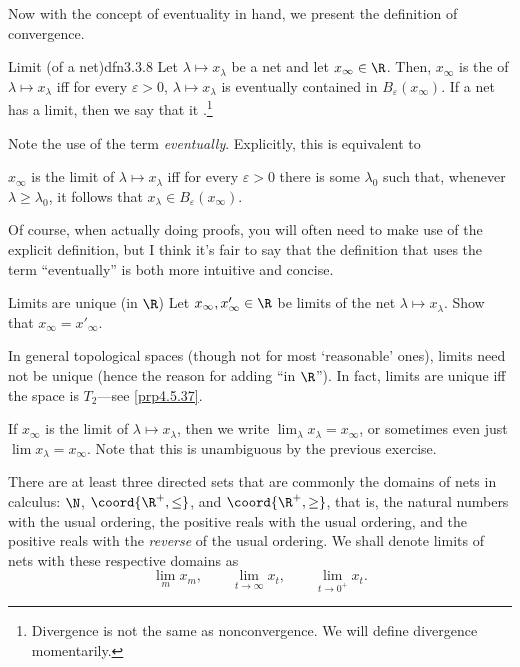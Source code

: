 Now with the concept of eventuality in hand, we present the definition of convergence.
\begin{dfn}{Limit (of a net)}{dfn3.3.8}
Let $\lambda \mapsto x_\lambda$ be a net and let $x_\infty\in \R$.  Then, $x_\infty$ is the  of $\lambda \mapsto x_\lambda$ iff for every $\varepsilon >0$, $\lambda \mapsto x_\lambda$ is eventually contained in $B_\varepsilon (x_\infty)$.   If a net has a limit, then we say that it .\footnote{Divergence is not the same as nonconvergence.  We will define divergence momentarily.}
\begin{rmk}
Note the use of the term \emph{eventually}.  Explicitly, this is equivalent to
\begin{textequation}
$x_\infty$ is the limit of $\lambda \mapsto x_\lambda$ iff for every $\varepsilon >0$ there is some $\lambda _0$ such that, whenever $\lambda \geq \lambda _0$, it follows that $x_\lambda \in B_{\varepsilon}(x_\infty)$.
\end{textequation}
Of course, when actually doing proofs, you will often need to make use of the explicit definition, but I think it's fair to say that the definition that uses the term ``eventually'' is both more intuitive and concise.
\end{rmk}
\begin{exr}[breakable=false]{Limits are unique (in $\R$)}{}
Let $x_\infty,x'_\infty\in \R$ be limits of the net $\lambda \mapsto x_\lambda$.  Show that $x_\infty=x'_\infty$.
\begin{rmk}
In general topological spaces (though not for most `reasonable' ones), limits need not be unique (hence the reason for adding ``in $\R$'').  In fact, limits are unique iff the space is $T_2$---see \cref{prp4.5.37}.
\end{rmk}
\end{exr}
\begin{rmk}
If $x_\infty$ is the limit of $\lambda \mapsto x_\lambda$, then we write $\lim _\lambda x_\lambda =x_\infty$, or sometimes even just $\lim x_{\lambda}=x_{\infty}$.  Note that this is unambiguous by the previous exercise.
\end{rmk}
\begin{rmk}
There are at least three directed sets that are commonly the domains of nets in calculus:  $\N$, $\coord{\R ^+,\leq}$, and $\coord{\R ^+,\geq}$, that is, the natural numbers with the usual ordering, the positive reals with the usual ordering, and the positive reals with the \emph{reverse} of the usual ordering.  We shall denote limits of nets with these respective domains as
\begin{equation}
\lim _mx_m,\qquad \lim _{t\to \infty}x_t,\qquad \lim _{t\to 0^+}x_t.
\end{equation}
\end{rmk}
\end{dfn}
